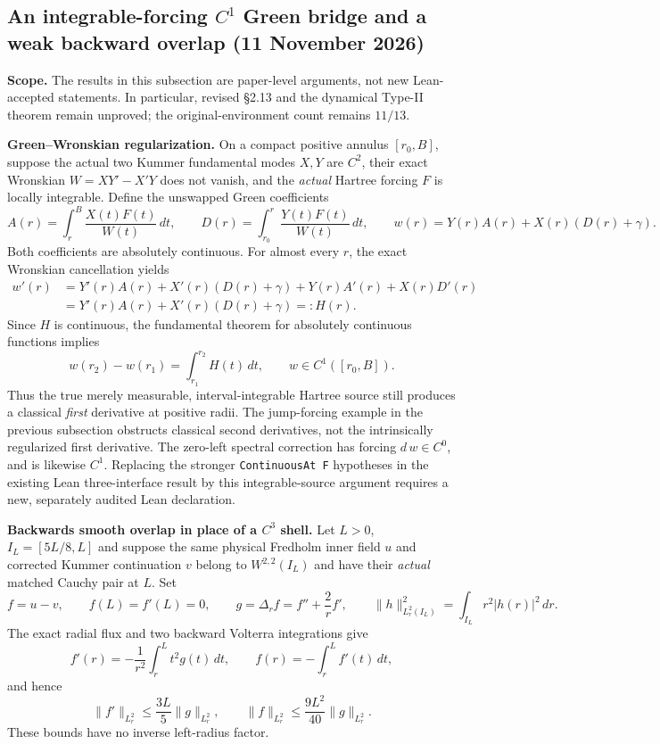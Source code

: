 
\subsection*{An integrable-forcing $C^1$ Green bridge and a weak backward overlap (11 November 2026)}
\noindent\textbf{Scope.}
The results in this subsection are paper-level arguments, not new Lean-accepted
statements. In particular, revised \S2.13 and the dynamical Type-II theorem
remain unproved; the original-environment count remains $11/13$.

\medskip
\noindent\textbf{Green--Wronskian regularization.}
On a compact positive annulus $[r_0,B]$, suppose the actual two Kummer
fundamental modes $X,Y$ are $C^2$, their exact Wronskian
$W=XY'-X'Y$ does not vanish, and the \emph{actual} Hartree forcing
$F$ is locally integrable. Define the unswapped Green coefficients
\[
 A(r)=\int_r^B\frac{X(t)F(t)}{W(t)}\,dt,\qquad
 D(r)=\int_{r_0}^r\frac{Y(t)F(t)}{W(t)}\,dt,\qquad
 w(r)=Y(r)A(r)+X(r)(D(r)+\gamma).
\]
Both coefficients are absolutely continuous. For almost every $r$,
the exact Wronskian cancellation yields
\[
\begin{split}
 w'(r)&=Y'(r)A(r)+X'(r)(D(r)+\gamma)
      +Y(r)A'(r)+X(r)D'(r)\\
 &=Y'(r)A(r)+X'(r)(D(r)+\gamma)=:H(r).
\end{split}
\]
Since $H$ is continuous, the fundamental theorem for absolutely
continuous functions implies
\[
 w(r_2)-w(r_1)=\int_{r_1}^{r_2}H(t)\,dt,\qquad
 w\in C^1([r_0,B]).
 \tag{WG-C1}
\]
Thus the true merely measurable, interval-integrable Hartree source
still produces a classical \emph{first} derivative at positive radii.
The jump-forcing example in the previous subsection obstructs
classical second derivatives, not the intrinsically regularized
first derivative. The zero-left spectral correction has forcing
$d\,w\in C^0$, and is likewise $C^1$. Replacing the stronger
\texttt{ContinuousAt F} hypotheses in the existing Lean
three-interface result by this integrable-source argument requires
a new, separately audited Lean declaration.

\medskip
\noindent\textbf{Backwards smooth overlap in place of a $C^3$ shell.}
Let $L>0$, $I_L=[5L/8,L]$ and suppose the same physical Fredholm
inner field $u$ and corrected Kummer continuation $v$ belong to
$W^{2,2}(I_L)$ and have their \emph{actual} matched Cauchy pair at $L$.
Set
\[
 f=u-v,\qquad f(L)=f'(L)=0,\qquad
 g=\Delta_r f=f''+\frac2r f',\qquad
 \|h\|_{L^2_r(I_L)}^2=\int_{I_L}r^2|h(r)|^2\,dr.
\]
The exact radial flux and two backward Volterra integrations give
\[
 f'(r)=-\frac1{r^2}\int_r^L t^2g(t)\,dt,\qquad
 f(r)=-\int_r^L f'(t)\,dt,
\]
and hence
\[
 \|f'\|_{L^2_r}\le\frac{3L}{5}\|g\|_{L^2_r},
 \qquad
 \|f\|_{L^2_r}\le\frac{9L^2}{40}\|g\|_{L^2_r}.
 \tag{WG-V}
\]
These bounds have no inverse left-radius factor.


